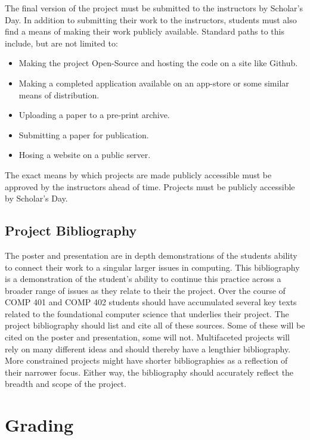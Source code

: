 \documentclass[10pt]{article}
\begin{document}
The final version of the project must be submitted to the instructors by Scholar's Day. In addition to submitting their work to the instructors, students must also find a means of making their work publicly available. Standard paths to this include, but are not limited to:
\begin{itemize}
\item Making the project Open-Source and hosting the code on a site like Github.
\item Making a completed application available on an app-store or some similar means of distribution.
\item Uploading a paper to a pre-print archive.
\item Submitting a paper for publication.
\item Hosing a website on a public server.
\end{itemize}
The exact means by which projects are made publicly accessible must be approved by the instructors ahead of time. Projects must be publicly accessible by Scholar's Day.

\subsection{Project Bibliography}

The poster and presentation are in depth demonstrations of the students ability to connect their work to a singular larger issues in computing. This bibliography is a demonstration of the student's ability to continue this practice across a broader range of issues as they relate to their the project. Over the course of COMP 401 and COMP 402 students should have accumulated several key texts related to the foundational computer science that underlies their project. The project bibliography should list and cite all of these sources. Some of these will be cited on the poster and presentation, some will not.  Multifaceted projects will rely on many different ideas and should thereby have a lengthier bibliography. More constrained projects might have shorter bibliographies as a reflection of their narrower focus. Either way, the bibliography should accurately reflect the breadth and scope of the project.

\section{Grading}
\end{document}
